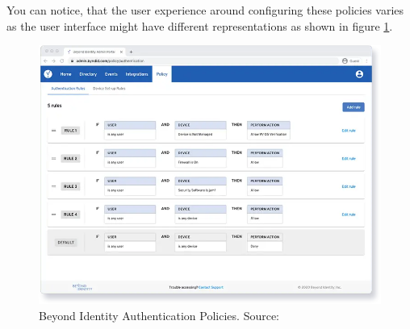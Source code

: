 You can notice, that the user experience around configuring these policies varies as the user interface might have different representations as shown in figure \ref{fig:beyond-identity-auth-policy}. \cite{existing-beyond-identity}

\begin{figure}[htbp]
  \centering
  \includegraphics[width=1\textwidth]{img/beyond-auth-policy.png}
  \caption[Beyond Identity Authentication Policies]{Beyond Identity Authentication Policies. Source: \cite{existing-beyond-identity}}
  \label{fig:beyond-identity-auth-policy}
\end{figure}

\newpage
